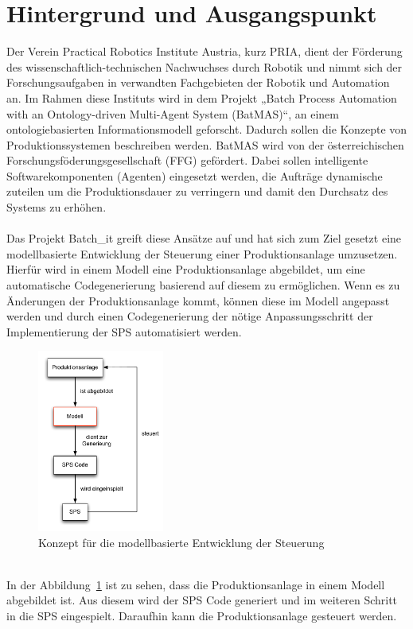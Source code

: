 \section{Hintergrund und Ausgangspunkt}
Der Verein Practical Robotics Institute Austria, kurz PRIA, dient der Förderung des wissenschaftlich-technischen Nachwuchses durch Robotik und nimmt sich der Forschungsaufgaben in verwandten Fachgebieten der Robotik und Automation an.
Im Rahmen diese Instituts wird in dem Projekt „Batch Process Automation with an On\-to\-lo\-gy-driven Multi-Agent System (BatMAS)“, an einem ontologiebasierten Informationsmodell geforscht. Dadurch sollen die Konzepte von Produktionssystemen  beschreiben werden. BatMAS wird von  der österreichischen Forschungsföderungsgesellschaft (FFG) gefördert. Dabei sollen intelligente Softwarekomponenten (Agenten) eingesetzt werden, die Aufträge dynamische zuteilen um die Produktionsdauer zu verringern und damit den Durchsatz des Systems zu erhöhen.\\\\
Das Projekt Batch\_it greift diese Ansätze auf und hat sich zum Ziel gesetzt eine modellbasierte Entwicklung der Steuerung einer Produktionsanlage umzusetzen. Hierfür wird in einem Modell eine Produktionsanlage abgebildet, um eine automatische Codegenerierung basierend auf diesem zu ermöglichen. Wenn es zu Änderungen der Produktionsanlage kommt, können diese im Modell angepasst werden und durch einen Codegenerierung der nötige Anpassungsschritt der Implementierung der SPS automatisiert werden.
\begin{figure}[h!]
		\centering
		\includegraphics[width=0.37\textwidth]{graphics/konzept/konzept.pdf}
		\caption{Konzept für die modellbasierte Entwicklung der Steuerung}
		\label{fig:konzept}
\end{figure} \\
In der Abbildung~\ref{fig:konzept} ist zu sehen, dass die Produktionsanlage in einem Modell abgebildet ist. Aus diesem wird der SPS Code generiert und im weiteren Schritt in die SPS eingespielt. Daraufhin kann die Produktionsanlage gesteuert werden. 

